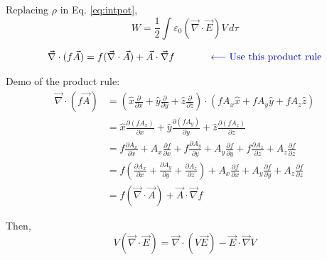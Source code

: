 \documentclass[12pt]{article}
\begin{document}
\begin{flushleft}
Replacing $\rho$ in Eq. \ref{eq:intpot},
\begin{equation}
 W = \frac{1}{2}   \int \varepsilon_{0} (\vec{\nabla} \cdot \vec{E}) V \, d\tau
 \label{eq:intfield}
 \end{equation} 
 
\begin{equation*}
\vec{\nabla} \cdot (f\vec{A})  =  f(\vec{\nabla} \cdot \vec{A}) + \vec{A} \cdot \vec{\nabla}f  \hspace{.5in} {\color{myblue} \longleftarrow \mbox{Use this product rule}} 
\end{equation*}

Demo of the product rule:\\

\begin{equation*}
\begin{aligned}
 \vec{\nabla} \cdot (f\vec{A})  & = \left( \hat{x}\frac{\partial }{\partial x} + \hat{y}\frac{\partial }{\partial y} + \hat{z}\frac{\partial }{\partial z}\right)  \cdot \left( fA_{x}\hat{x} + fA_{y}\hat{y} + fA_{z}\hat{z} \right) \\
& = \hat{x}\frac{\partial (fA_{x})}{\partial x} + \hat{y}\frac{\partial (fA_{y})}{\partial y} + \hat{z}\frac{\partial (fA_{z})}{\partial z} \\
& = f\frac{\partial A_{x}}{\partial x} + A_{x}\frac{\partial f}{\partial x} + f\frac{\partial A_{y}}{\partial y} + A_{y}\frac{\partial f}{\partial y} + f\frac{\partial A_{z}}{\partial z} + A_{z}\frac{\partial f}{\partial z} \\
& = f\left( \frac{\partial A_{x}}{\partial x} + \frac{\partial A_{y}}{\partial y} +\frac{\partial A_{z}}{\partial z} \right) 
+ A_{x}\frac{\partial f}{\partial x} + A_{y}\frac{\partial f}{\partial y} + A_{z}\frac{\partial f}{\partial z} \\
& = f(\vec{\nabla} \cdot \vec{A}) + \vec{A} \cdot \vec{\nabla}f 
\end{aligned}
\end{equation*}


Then, 
\begin{equation}
V(\vec{\nabla} \cdot \vec{E})  =  \vec{\nabla} \cdot (V\vec{E}) - \vec{E} \cdot \vec{\nabla}V
\label{eq:product}
\end{equation} 


\end{flushleft}
\end{document}
